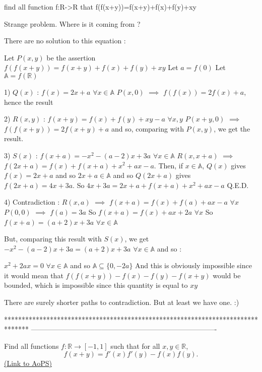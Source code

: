 \begin{solution}
	\begin{tcolorbox}find all function f:R->R that f(f(x+y))=f(x+y)+f(x)+f(y)+xy\end{tcolorbox}

Strange problem. Where is it coming from ?

There are no solution to this equation :

Let $ P(x,y)$ be the assertion $ f(f(x + y)) = f(x + y) + f(x) + f(y) + xy$
Let $ a = f(0)$
Let $ \mathbb A = f(\mathbb R)$

1) $ Q(x)$ : $ f(x) = 2x + a$ $ \forall x\in\mathbb A$
$ P(x,0)$ $ \implies$ $ f(f(x)) = 2f(x) + a$, hence the result


2) $ R(x,y)$ : $ f(x + y) = f(x) + f(y) + xy - a$ $ \forall x,y$
$ P(x + y,0)$ $ \implies$ $ f(f(x + y)) = 2f(x + y) + a$ and so, comparing with $ P(x,y)$, we get the result.

3) $ S(x)$ : $ f(x + a) = - x^2 - (a - 2)x + 3a$ $ \forall x\in\mathbb A$
$ R(x,x + a)$ $ \implies$ $ f(2x + a) = f(x) + f(x + a) + x^2 + ax - a$. Then, if $ x\in\mathbb A$, $ Q(x)$ gives $ f(x) = 2x + a$ and so $ 2x + a\in\mathbb A$ and so $ Q(2x + a)$ gives $ f(2x + a) = 4x + 3a$. So $ 4x + 3a = 2x + a + f(x + a) + x^2 + ax - a$
Q.E.D.

4) Contradiction :
$ R(x,a)$ $ \implies$ $ f(x + a) = f(x) + f(a) + ax - a$ $ \forall x$
$ P(0,0)$ $ \implies$ $ f(a) = 3a$
So $ f(x + a) = f(x) + ax + 2a$ $ \forall x$
So $ f(x + a) = (a + 2)x + 3a$ $ \forall x\in\mathbb A$

But, comparing this result with $ S(x)$, we get $ - x^2 - (a - 2)x + 3a = (a + 2)x + 3a$ $ \forall x\in\mathbb A$ and so :

$ x^2 + 2ax = 0$ $ \forall x\in\mathbb A$ and so $ \mathbb A\subseteq\{0, - 2a\}$
And this is obviously impossible since it would mean that $ f(f(x + y)) - f(x) - f(y) - f(x + y)$ would be bounded, which is impossible since this quantity is equal to $ xy$

There are surely shorter paths to contradiction. 
But at least we have one.  :)
\end{solution}
*******************************************************************************
-------------------------------------------------------------------------------

\begin{problem}
	Find all functions $f: \mathbb R \to [-1,1]$ such that for all $x,y \in \mathbb R$,
\[f(x+y)=f'(x)f'(y)-f(x)f(y).\]
	\flushright \href{https://artofproblemsolving.com/community/c6h294664}{(Link to AoPS)}
\end{problem}



